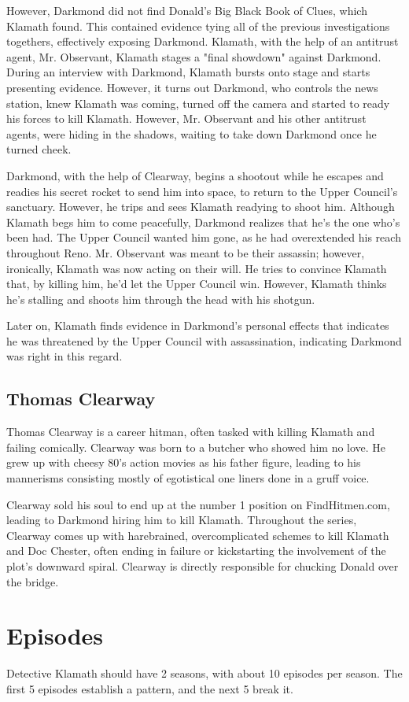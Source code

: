 \documentclass{article}
\begin{document}
However, Darkmond did not find Donald's Big Black Book of Clues, which Klamath found. This contained evidence tying all of the previous investigations togethers, effectively exposing Darkmond. Klamath, with the help of an antitrust agent, Mr. Observant, Klamath stages a "final showdown" against Darkmond. During an interview with Darkmond, Klamath bursts onto stage and starts presenting evidence. However, it turns out Darkmond, who controls the news station, knew Klamath was coming, turned off the camera and started to ready his forces to kill Klamath. However, Mr. Observant and his other antitrust agents, were hiding in the shadows, waiting to take down Darkmond once he turned cheek. 

Darkmond, with the help of Clearway, begins a shootout while he escapes and readies his secret rocket to send him into space, to return to the Upper Council's sanctuary. However, he trips and sees Klamath readying to shoot him. Although Klamath begs him to come peacefully, Darkmond realizes that he's the one who's been had. The Upper Council wanted him gone, as he had overextended his reach throughout Reno. Mr. Observant was meant to be their assassin; however, ironically, Klamath was now acting on their will. He tries to convince Klamath that, by killing him, he'd let the Upper Council win. However, Klamath thinks he's stalling and shoots him through the head with his shotgun.

Later on, Klamath finds evidence in Darkmond's personal effects that indicates he was threatened by the Upper Council with assassination, indicating Darkmond was right in this regard.

\subsection{Thomas Clearway}

Thomas Clearway is a career hitman, often tasked with killing Klamath and failing comically. Clearway was born to a butcher who showed him no love. He grew up with cheesy 80's action movies as his father figure, leading to his mannerisms consisting mostly of egotistical one liners done in a gruff voice.

Clearway sold his soul to end up at the number 1 position on FindHitmen.com, leading to Darkmond hiring him to kill Klamath. Throughout the series, Clearway comes up with harebrained, overcomplicated schemes to kill Klamath and Doc Chester, often ending in failure or kickstarting the involvement of the plot's downward spiral. Clearway is directly responsible for chucking Donald over the bridge.

\section{Episodes}

Detective Klamath should have 2 seasons, with about 10 episodes per season. The first 5 episodes establish a pattern, and the next 5 break it.
\end{document}

